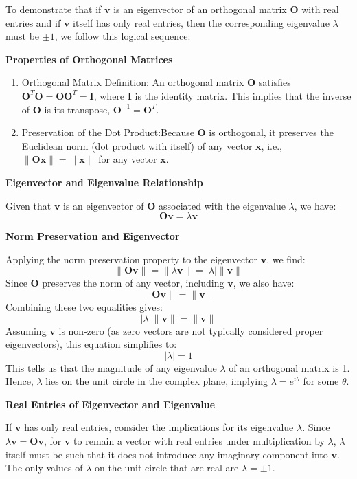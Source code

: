 \documentclass[8pt]{article}
\begin{document}
To demonstrate that if \(\mathbf{v}\) is an eigenvector of an orthogonal matrix \(\mathbf{O}\) with real entries and if \(\mathbf{v}\) itself has only real entries, then the corresponding eigenvalue \(\lambda\) must be \(\pm 1\), we follow this logical sequence:

\textbf{Properties of Orthogonal Matrices}

\begin{enumerate}
    \item Orthogonal Matrix Definition: An orthogonal matrix \(\mathbf{O}\) satisfies \(\mathbf{O}^T \mathbf{O} = \mathbf{O} \mathbf{O}^T = \mathbf{I}\), where \(\mathbf{I}\) is the identity matrix. This implies that the inverse of \(\mathbf{O}\) is its transpose, \(\mathbf{O}^{-1} = \mathbf{O}^T\).
    \item Preservation of the Dot Product:Because \(\mathbf{O}\) is orthogonal, it preserves the Euclidean norm (dot product with itself) of any vector \(\mathbf{x}\), i.e., \(\|\mathbf{Ox}\| = \|\mathbf{x}\|\) for any vector \(\mathbf{x}\).
\end{enumerate}

\textbf{Eigenvector and Eigenvalue Relationship}

Given that \(\mathbf{v}\) is an eigenvector of \(\mathbf{O}\) associated with the eigenvalue \(\lambda\), we have:
\[
\mathbf{Ov} = \lambda \mathbf{v}
\]

\textbf{Norm Preservation and Eigenvector}

Applying the norm preservation property to the eigenvector \(\mathbf{v}\), we find:
\[
\|\mathbf{Ov}\| = \|\lambda \mathbf{v}\| = |\lambda| \|\mathbf{v}\|
\]
Since \(\mathbf{O}\) preserves the norm of any vector, including \(\mathbf{v}\), we also have:
\[
\|\mathbf{Ov}\| = \|\mathbf{v}\|
\]
Combining these two equalities gives:
\[
|\lambda| \|\mathbf{v}\| = \|\mathbf{v}\|
\]
Assuming \(\mathbf{v}\) is non-zero (as zero vectors are not typically considered proper eigenvectors), this equation simplifies to:
\[
|\lambda| = 1
\]
This tells us that the magnitude of any eigenvalue \(\lambda\) of an orthogonal matrix is 1. Hence, \(\lambda\) lies on the unit circle in the complex plane, implying \(\lambda = e^{i\theta}\) for some \(\theta\).

\textbf{Real Entries of Eigenvector and Eigenvalue}

If \(\mathbf{v}\) has only real entries, consider the implications for its eigenvalue \(\lambda\). Since \(\lambda \mathbf{v} = \mathbf{Ov}\), for \(\mathbf{v}\) to remain a vector with real entries under multiplication by \(\lambda\), \(\lambda\) itself must be such that it does not introduce any imaginary component into \(\mathbf{v}\). The only values of \(\lambda\) on the unit circle that are real are \(\lambda = \pm 1\).
\end{document}
